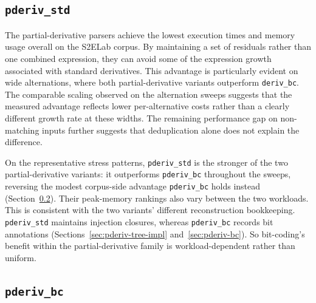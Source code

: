 %
%
%


\subsection{\texttt{pderiv\_std}}
\label{sec:eval-cost-partial-derivatives}

The partial-derivative parsers achieve the lowest
execution times and memory usage overall on the
S2ELab corpus. By maintaining a set of residuals
rather than one combined expression, they can
avoid some of the expression growth associated
with standard derivatives.
This advantage is particularly evident on wide
alternations, where both partial-derivative
variants outperform \texttt{deriv\_bc}.
The comparable scaling observed on the
alternation sweeps suggests that the measured
advantage reflects lower per-alternative
costs rather than a clearly different
growth rate at these widths.
The remaining performance gap on
non-matching inputs further suggests
that deduplication alone does not
explain the difference.

On the representative stress patterns,
\texttt{pderiv\_std} is the stronger of the
two partial-derivative variants: it outperforms
\texttt{pderiv\_bc} throughout the sweeps,
reversing the modest corpus-side advantage
\texttt{pderiv\_bc} holds instead
(Section~\ref{sec:eval-cost-pderiv-bc}).
Their peak-memory rankings also vary between
the two workloads.
This is consistent with the two variants'
different reconstruction bookkeeping.
\texttt{pderiv\_std} maintains injection
closures, whereas \texttt{pderiv\_bc}
records bit annotations
(Sections~\ref{sec:pderiv-tree-impl}
and~\ref{sec:pderiv-bc}).
So bit-coding's
benefit within the partial-derivative family
is workload-dependent rather than uniform.

%
%
%


\subsection{\texttt{pderiv\_bc}}
\label{sec:eval-cost-pderiv-bc}

